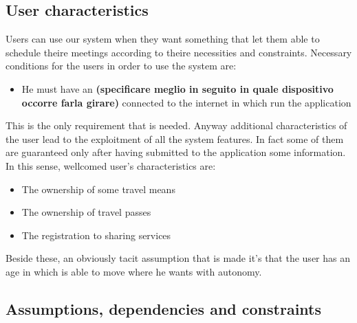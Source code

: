 \subsection{User characteristics}
Users can use our system when they want something that let them able to schedule theire meetings according to theire necessities and constraints. Necessary conditions for the users in order to use the system are: 

\begin{itemize}
\item He must have an \textbf{(specificare meglio in seguito in quale dispositivo occorre farla girare)} connected to the internet in which run the application
\end{itemize}

This is the only requirement that is needed. Anyway additional characteristics of the user lead to the exploitment of  all the system features. In fact some of them are guaranteed only after having submitted to the application some information.
In this sense, wellcomed user's characteristics are:

\begin{itemize}
\item The ownership of some travel means
\item The ownership of travel passes
\item The registration to sharing services
\end{itemize}

Beside these, an obviously tacit assumption that is made it's that the user has an age in which is able to move where he wants with autonomy.


\subsection{ Assumptions, dependencies and constraints}

